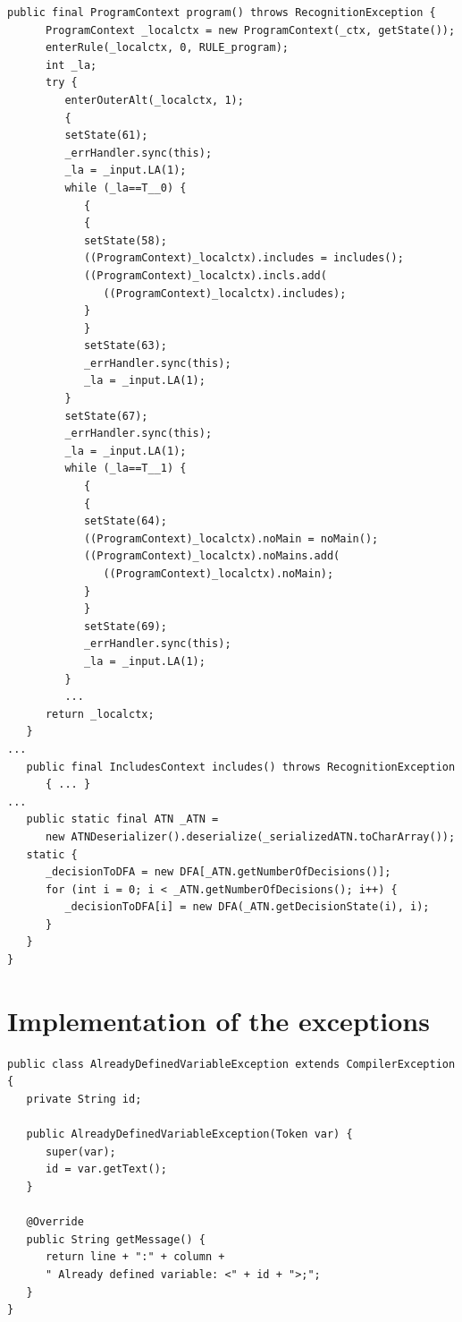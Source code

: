 \begin{lstlisting}[frame=htrbl, caption={Generation of {\ttfamily EParser.java}}, label={lst:parser}, basicstyle=\footnotesize]
   public final ProgramContext program() throws RecognitionException {
      ProgramContext _localctx = new ProgramContext(_ctx, getState());
      enterRule(_localctx, 0, RULE_program);
      int _la;
      try {
         enterOuterAlt(_localctx, 1);
         {
         setState(61);
         _errHandler.sync(this);
         _la = _input.LA(1);
         while (_la==T__0) {
            {
            {
            setState(58);
            ((ProgramContext)_localctx).includes = includes();
            ((ProgramContext)_localctx).incls.add(
               ((ProgramContext)_localctx).includes);
            }
            }
            setState(63);
            _errHandler.sync(this);
            _la = _input.LA(1);
         }
         setState(67);
         _errHandler.sync(this);
         _la = _input.LA(1);
         while (_la==T__1) {
            {
            {
            setState(64);
            ((ProgramContext)_localctx).noMain = noMain();
            ((ProgramContext)_localctx).noMains.add(
               ((ProgramContext)_localctx).noMain);
            }
            }
            setState(69);
            _errHandler.sync(this);
            _la = _input.LA(1);
         }
         ...
      return _localctx;
   }  
...
   public final IncludesContext includes() throws RecognitionException 
      { ... }     
...
   public static final ATN _ATN =
      new ATNDeserializer().deserialize(_serializedATN.toCharArray());
   static {
      _decisionToDFA = new DFA[_ATN.getNumberOfDecisions()];
      for (int i = 0; i < _ATN.getNumberOfDecisions(); i++) {
         _decisionToDFA[i] = new DFA(_ATN.getDecisionState(i), i);
      }
   }
}    
\end{lstlisting}

\newpage

\section*{Implementation of the exceptions}
\label{sec:exceptions}

\begin{lstlisting}[frame=htrbl, caption={Implementation of {\ttfamily AlreadyDefinedVariableException.java}}, label={lst:already_defined_variable_exception}, basicstyle=\footnotesize]
public class AlreadyDefinedVariableException extends CompilerException {
   private String id;

   public AlreadyDefinedVariableException(Token var) {
      super(var);
      id = var.getText();
   }

   @Override
   public String getMessage() {
      return line + ":" + column + 
      " Already defined variable: <" + id + ">;";
   }
}
\end{lstlisting}

